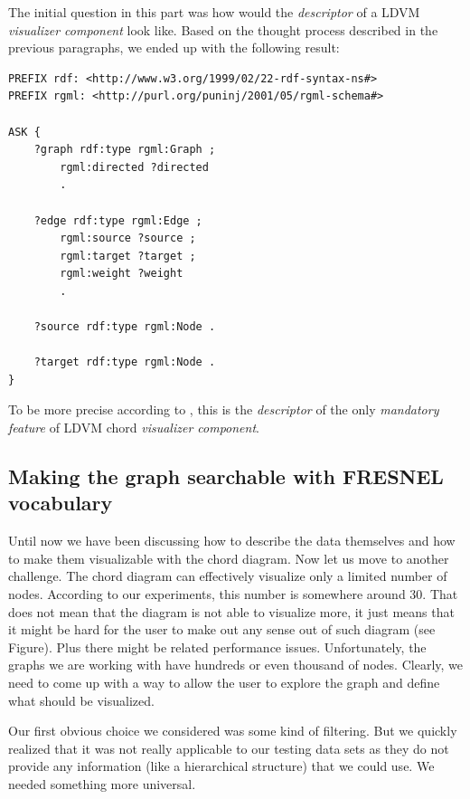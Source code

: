The initial question in this part was how would the \emph{descriptor} of a LDVM \emph{visualizer component} look like. Based on the thought process described in the previous paragraphs, we ended up with the following result:

\begin{verbatim}
PREFIX rdf: <http://www.w3.org/1999/02/22-rdf-syntax-ns#>
PREFIX rgml: <http://purl.org/puninj/2001/05/rgml-schema#>

ASK {
    ?graph rdf:type rgml:Graph ;
        rgml:directed ?directed 
        .
            
    ?edge rdf:type rgml:Edge ;
        rgml:source ?source ;
        rgml:target ?target ;
        rgml:weight ?weight 
        .
            
    ?source rdf:type rgml:Node .
    
    ?target rdf:type rgml:Node .
}
\end{verbatim}

To be more precise according to \cite{ldvm_use_cases}, this is the \emph{descriptor} of the only \emph{mandatory feature} of LDVM chord \emph{visualizer component}.

\subsection{Making the graph searchable with FRESNEL vocabulary}


Until now we have been discussing how to describe the data themselves and how to make them visualizable with the chord diagram. Now let us move to another challenge. The chord diagram can effectively visualize only a limited number of nodes. According to our experiments, this number is somewhere around 30. That does not mean that the diagram is not able to visualize more, it just means that it might be hard for the user to make out any sense out of such diagram (see Figure). Plus there might be related performance issues. Unfortunately, the graphs we are working with have hundreds or even thousand of nodes. Clearly, we need to come up with a way to allow the user to explore the graph and define what should be visualized.

Our first obvious choice we considered was some kind of filtering. But we quickly realized that it was not really applicable to our testing data sets as they do not provide any information (like a hierarchical structure) that we could use. We needed something more universal.


